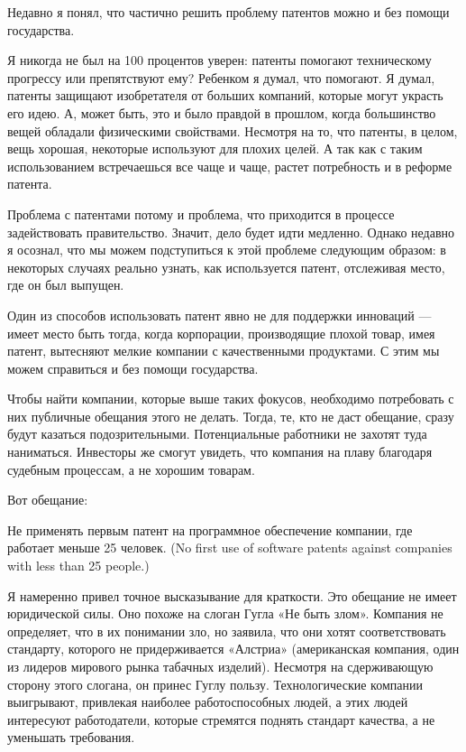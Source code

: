 \documentclass[ebook,12pt,oneside,openany]{memoir}
\begin{document}
\maketitle

Недавно я понял, что частично решить проблему патентов можно и без
помощи государства.


Я никогда не был на 100 процентов уверен: патенты помогают
техническому прогрессу или препятствуют ему? Ребенком я думал, что
помогают. Я думал, патенты защищают изобретателя от больших компаний,
которые могут украсть его идею. А, может быть, это и было правдой в
прошлом, когда большинство вещей обладали физическими свойствами.
Несмотря на то, что патенты, в целом, вещь хорошая, некоторые
используют для плохих целей. А так как с таким использованием
встречаешься все чаще и чаще, растет потребность и в реформе патента.

Проблема с патентами потому и проблема, что приходится в процессе
задействовать правительство. Значит, дело будет идти медленно. Однако
недавно я осознал, что мы можем подступиться к этой проблеме следующим
образом: в некоторых случаях реально узнать, как используется патент,
отслеживая место, где он был выпущен.

Один из способов использовать патент явно не для поддержки инноваций —
имеет место быть тогда, когда корпорации, производящие плохой товар,
имея патент, вытесняют мелкие компании с качественными продуктами. С
этим мы можем справиться и без помощи государства.

Чтобы найти компании, которые выше таких фокусов, необходимо
потребовать с них публичные обещания этого не делать. Тогда, те, кто
не даст обещание, сразу будут казаться подозрительными. Потенциальные
работники не захотят туда наниматься. Инвесторы же смогут увидеть, что
компания на плаву благодаря судебным процессам, а не хорошим товарам.

Вот обещание:

Не применять первым патент на программное обеспечение компании, где
работает меньше 25 человек. (No first use of software patents against
companies with less than 25 people.)

Я намеренно привел точное высказывание для краткости. Это обещание не
имеет юридической силы. Оно похоже на слоган Гугла «Не быть злом».
Компания не определяет, что в их понимании зло, но заявила, что они
хотят соответствовать стандарту, которого не придерживается «Алстриа»
(американская компания, один из лидеров мирового рынка табачных
изделий). Несмотря на сдерживающую сторону этого слогана, он принес
Гуглу пользу. Технологические компании выигрывают, привлекая наиболее
работоспособных людей, а этих людей интересуют работодатели, которые
стремятся поднять стандарт качества, а не уменьшать требования.
\end{document}

